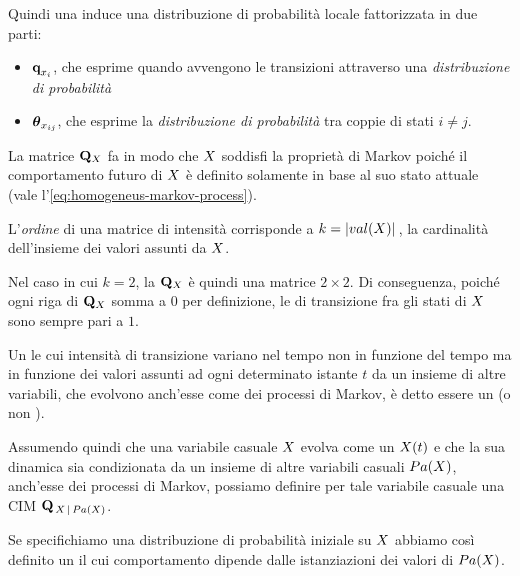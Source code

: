 Quindi una \im*{} induce una distribuzione di probabilità locale fattorizzata in due parti:
\begin{itemize}
    \item $\boldsymbol{\textbf{\text{q}}}_{\mathnormal{x}_i}$, che esprime quando avvengono le transizioni attraverso una \emph{distribuzione di probabilità }
    \item $\boldsymbol{\textbf{\text{$\theta$}}}_{\mathnormal{x}_{ij}}$, che esprime la \emph{distribuzione di probabilità } tra coppie di stati $i \neq j$.
\end{itemize}
La matrice $\mathbf{Q}_{\mathnormal{X}}$ fa in modo che $\mathnormal{X}$ soddisfi la proprietà di Markov poiché il comportamento futuro di $\mathnormal{X}$ è definito solamente in base al suo stato attuale (vale l'\autoref{eq:homogeneus-markov-process}).
\begin{osservazione}
L'\emph{ordine} di una matrice di intensità corrisponde a $k=|val(\mathnormal{X})|\,$, la cardinalità dell'insieme dei valori assunti da $\mathnormal{X}$.
\end{osservazione}
\begin{osservazione}\label{oss:squared-im}
Nel caso in cui $k=2$, la \im*{} $\mathbf{Q}_{\mathnormal{X}}$ è quindi una matrice $2\times2$. Di conseguenza, poiché ogni riga di $\mathbf{Q}_{\mathnormal{X}}$ somma a $0$ per definizione, le \emph{} di transizione fra gli stati di $\mathnormal{X}$ sono sempre pari a $1$.
\end{osservazione}

\begin{definizione}[\upcase\mprocess*{} \cond*{}]
\label{defn:conditional-markov-process}
Un \mprocess*{} le cui intensità di transizione variano nel tempo non in funzione del tempo ma in funzione dei valori assunti ad ogni determinato istante $t$ da un insieme di altre variabili, che evolvono anch'esse come dei processi di Markov, è detto essere un \mprocess*{} \cond*{} (o \mprocess*{} non \omog*{}).

Assumendo quindi che una variabile casuale $\mathnormal{X}$ evolva come un \mprocess*{} $\mathnormal{X}(t)$ e che la sua dinamica sia condizionata da un insieme di altre variabili casuali $Pa(\mathnormal{X})$, anch'esse dei processi di Markov, possiamo definire per tale variabile casuale una \acf{CIM} $\mathbf{Q}_{\,\mathnormal{X}\,\arrowvert\,Pa(\mathnormal{X})}$.

Se specifichiamo una distribuzione di probabilità iniziale su $\mathnormal{X}$ abbiamo così definito un \mprocess*{} il cui comportamento dipende dalle istanziazioni dei valori di $Pa(\mathnormal{X})$.
\end{definizione}


